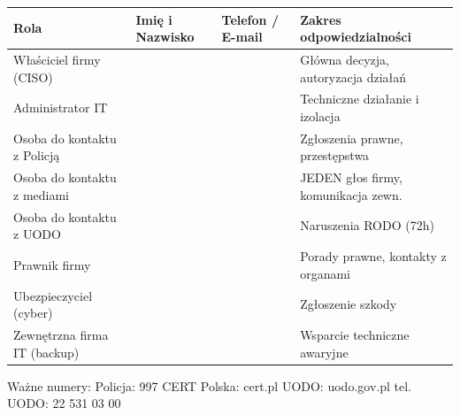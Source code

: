 \documentclass[12pt,a4paper]{article}
\begin{document}
\begin{longtable}[]{@{}>{\raggedright\arraybackslash}p{}>{\raggedright\arraybackslash}p{}>{\raggedright\arraybackslash}p{}>{\raggedright\arraybackslash}p{}@{}}
\toprule\noalign{}
Rola & Imię i Nazwisko & Telefon / E-mail & Zakres odpowiedzialności \\
\midrule\noalign{}
\endhead
\bottomrule\noalign{}
\endlastfoot
Właściciel firmy (CISO) & \underline{\hspace{3cm}} &
\underline{\hspace{3cm}} & Główna decyzja, autoryzacja działań \\
Administrator IT & \underline{\hspace{3cm}} &
\underline{\hspace{3cm}} & Techniczne działanie i izolacja \\
Osoba do kontaktu z Policją & \underline{\hspace{3cm}} &
\underline{\hspace{3cm}} & Zgłoszenia prawne, przestępstwa \\
Osoba do kontaktu z mediami & \underline{\hspace{3cm}} &
\underline{\hspace{3cm}} & JEDEN głos firmy, komunikacja zewn. \\
Osoba do kontaktu z UODO & \underline{\hspace{3cm}} &
\underline{\hspace{3cm}} & Naruszenia RODO (72h) \\
Prawnik firmy & \underline{\hspace{3cm}} &
\underline{\hspace{3cm}} & Porady prawne, kontakty z organami \\
Ubezpieczyciel (cyber) & \underline{\hspace{3cm}} &
\underline{\hspace{3cm}} & Zgłoszenie szkody \\
Zewnętrzna firma IT (backup) & \underline{\hspace{3cm}} &
\underline{\hspace{3cm}} & Wsparcie techniczne awaryjne \\
\end{longtable}

Ważne numery: Policja: 997 \textbar{} CERT Polska: cert.pl \textbar{}
UODO: uodo.gov.pl \textbar{} tel. UODO: 22 531 03 00
\end{document}
